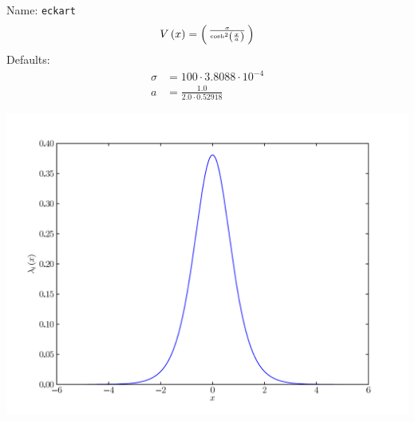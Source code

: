 \documentclass[a4paper,10pt]{report}
\begin{document}
\begin{minipage}{0.5\linewidth}
  Name:    \texttt{eckart}
  \begin{equation*}
    V\left( x \right) = \left(\begin{smallmatrix}\frac{\sigma}{\operatorname{cosh}^{2}\left(\frac{x}{a}\right)}\end{smallmatrix}\right)
  \end{equation*}
  Defaults:
  \begin{align*}
    \sigma & = 100 \cdot 3.8088 \cdot 10^{-4} \\
    a &= \frac{1.0}{2.0 \cdot 0.52918}
  \end{align*}
\end{minipage}
\begin{minipage}{0.5\linewidth}
  \begin{center}
    \includegraphics[scale=0.25]{./fig/eckart.pdf}
  \end{center}
\end{minipage}
\end{document}

